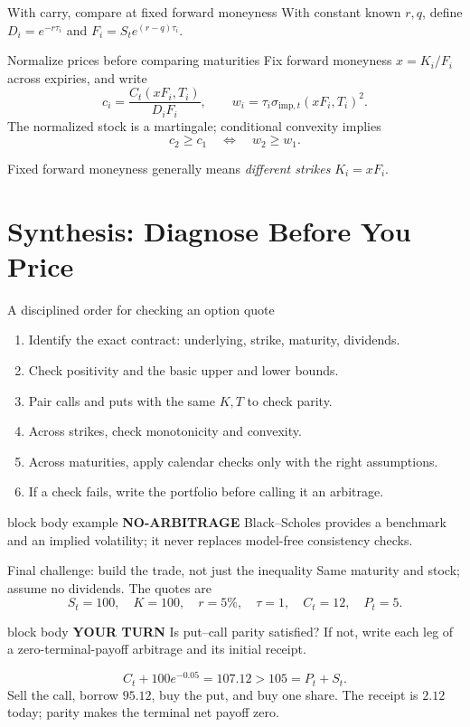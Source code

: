 \documentclass[handout,10pt,aspectratio=169]{beamer}
\newenvironment{marketbox}{\begin{beamercolorbox}[rounded=true,sep=0.7em,wd=\textwidth]{block body example}
  \textbf{\color{CourseGreen}NO-ARBITRAGE}\quad}{\end{beamercolorbox}}
\newenvironment{pausebox}{\begin{beamercolorbox}[rounded=true,sep=0.8em,wd=\textwidth]{block body}
  \textbf{\color{CourseGold}YOUR TURN}\quad}{\end{beamercolorbox}}
\newcommand{\1}{\mathbf 1}
\begin{document}
\begin{frame}{With carry, compare at fixed forward moneyness}
With constant known \(r,q\), define
\(D_i=e^{-r\tau_i}\) and \(F_i=S_te^{(r-q)\tau_i}\).
\begin{block}{Normalize prices before comparing maturities}
Fix forward moneyness \(x=K_i/F_i\) across expiries, and write
\[
c_i=\frac{C_t(xF_i,T_i)}{D_iF_i},\qquad
w_i=\tau_i\sigma_{\mathrm{imp},t}(xF_i,T_i)^2.
\]
The normalized stock is a martingale; conditional convexity implies
\[
\boxed{c_2\ge c_1\quad\Longleftrightarrow\quad w_2\ge w_1.}
\]
\end{block}
Fixed forward moneyness generally means \emph{different strikes} \(K_i=xF_i\).
\end{frame}

\section{Synthesis: Diagnose Before You Price}

\begin{frame}{A disciplined order for checking an option quote}
\begin{enumerate}
  \item Identify the exact contract: underlying, strike, maturity, dividends.
  \item Check positivity and the basic upper and lower bounds.
  \item Pair calls and puts with the same \(K,T\) to check parity.
  \item Across strikes, check monotonicity and convexity.
  \item Across maturities, apply calendar checks only with the right assumptions.
  \item If a check fails, write the portfolio before calling it an arbitrage.
\end{enumerate}
\begin{marketbox}
Black--Scholes provides a benchmark and an implied volatility; it never
replaces model-free consistency checks.
\end{marketbox}
\end{frame}

\begin{frame}{Final challenge: build the trade, not just the inequality}
Same maturity and stock; assume no dividends. The quotes are
\[
S_t=100,\quad K=100,\quad r=5\%,\quad \tau=1,
\quad C_t=12,\quad P_t=5.
\]
\begin{pausebox}
Is put--call parity satisfied? If not, write each leg of a zero-terminal-payoff
arbitrage and its initial receipt.
\end{pausebox}

\[
C_t+100e^{-0.05}=107.12>105=P_t+S_t.
\]
Sell the call, borrow \(95.12\), buy the put, and buy one share. The receipt
is \(2.12\) today; parity makes the terminal net payoff zero.
\end{frame}
\end{document}
